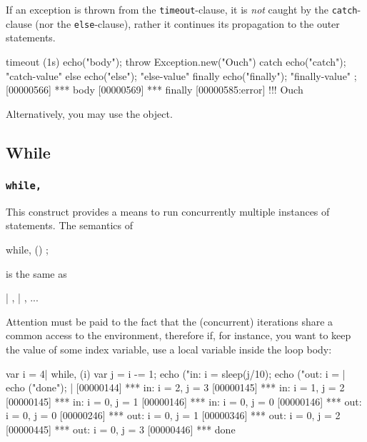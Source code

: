 If an exception is thrown from the \lstinline|timeout|-clause, it is
\emph{not} caught by the \lstinline|catch|-clause (nor the
\lstinline|else|-clause), rather it continues its propagation to the outer
statements.

\begin{urbiscript}
timeout (1s)  { echo("body"); throw Exception.new("Ouch") }
catch         { echo("catch"); "catch-value" }
else          { echo("else"); "else-value" }
finally       { echo("finally"); "finally-value" };
[00000566] *** body
[00000569] *** finally
[00000585:error] !!! Ouch
\end{urbiscript}

Alternatively, you may use the  object.

\subsection{While}
\subsubsection{\lstinline|while,|}
\label{sec:lang:while:comma}
\experimentalremoved{}

This construct provides a means to run concurrently multiple instances
of statements.  The semantics of

\begin{urbiunchecked}
while, ()
  ;
\end{urbiunchecked}

\noindent
is the same as

\begin{urbiunchecked}
 |  ,  |  , ...
\end{urbiunchecked}

Attention must be paid to the fact that the (concurrent) iterations
share a common access to the environment, therefore if, for instance,
you want to keep the value of some index variable, use a local
variable inside the loop body:

\begin{urbiscript}[firstnumber=1]
{
  var i = 4|
  while, (i)
  {
    var j = i -= 1;
    echo ("in: i = %
    sleep(j/10);
    echo ("out: i = %
  }|
  echo ("done");
}|
[00000144] *** in: i = 2, j = 3
[00000145] *** in: i = 1, j = 2
[00000145] *** in: i = 0, j = 1
[00000146] *** in: i = 0, j = 0
[00000146] *** out: i = 0, j = 0
[00000246] *** out: i = 0, j = 1
[00000346] *** out: i = 0, j = 2
[00000445] *** out: i = 0, j = 3
[00000446] *** done
\end{urbiscript}

